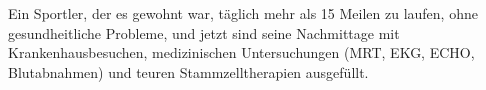 Ein Sportler, der es gewohnt war, täglich mehr als 15 Meilen zu laufen, ohne gesundheitliche Probleme, und jetzt sind seine Nachmittage mit Krankenhausbesuchen, medizinischen Untersuchungen (MRT, EKG, ECHO, Blutabnahmen) und teuren Stammzelltherapien ausgefüllt. 

